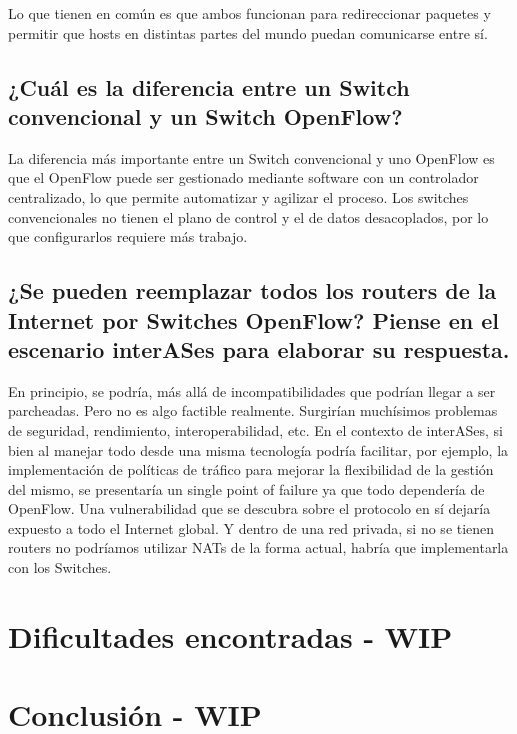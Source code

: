 \documentclass{article}
\begin{document}
Lo que tienen en común es que ambos funcionan para redireccionar paquetes y permitir que hosts en distintas partes del mundo puedan comunicarse entre sí.

\subsection{¿Cuál es la diferencia entre un Switch convencional y un Switch OpenFlow?}

La diferencia más importante entre un Switch convencional y uno OpenFlow es que el OpenFlow puede ser gestionado mediante software con un controlador centralizado, lo que permite automatizar y agilizar el proceso. Los switches convencionales no tienen el plano de control y el de datos desacoplados, por lo que configurarlos requiere más trabajo.

\subsection{¿Se pueden reemplazar todos los routers de la Internet por Switches OpenFlow? Piense en el escenario interASes para elaborar su respuesta.}

En principio, se podría, más allá de incompatibilidades que podrían llegar a ser parcheadas. Pero no es algo factible realmente. Surgirían muchísimos problemas de seguridad, rendimiento, interoperabilidad, etc. En el contexto de interASes, si bien al manejar todo desde una misma tecnología podría facilitar, por ejemplo, la implementación de políticas de tráfico para mejorar la flexibilidad de la gestión del mismo, se presentaría un single point of failure ya que todo dependería de OpenFlow. Una vulnerabilidad que se descubra sobre el protocolo en sí dejaría expuesto a todo el Internet global. Y dentro de una red privada, si no se tienen routers no podríamos utilizar NATs de la forma actual, habría que implementarla con los Switches. 

\section{Dificultades encontradas - WIP}\label{dificultades-encontradas}

\section{Conclusión - WIP}\label{conclusion-wip}
\end{document}
